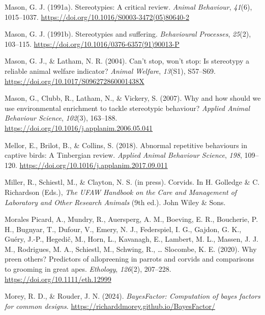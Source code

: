 \documentclass[
  pub]{apa6}
\newlength{\cslhangindent}
\newlength{\cslentryspacingunit} %
\newenvironment{CSLReferences}[2] %
 {%
  \setlength{\parindent}{0pt}
  \ifodd #1
  \let\oldpar\par
  \def\par{\hangindent=\cslhangindent\oldpar}
  \fi
  \setlength{\parskip}{#2\cslentryspacingunit}
 }%
 {}
\begin{document}
\begin{CSLReferences}{1}{0}
\leavevmode{}%
Mason, G. J. (1991a). Stereotypies: A critical review. \emph{Animal Behaviour}, \emph{41}(6), 1015--1037. \url{https://doi.org/10.1016/S0003-3472(05)80640-2}

\leavevmode{}%
Mason, G. J. (1991b). Stereotypies and suffering. \emph{Behavioural Processes}, \emph{25}(2), 103--115. \url{https://doi.org/10.1016/0376-6357(91)90013-P}

\leavevmode{}%
Mason, G. J., \& Latham, N. R. (2004). Can't stop, won't stop: Is stereotypy a reliable animal welfare indicator? \emph{Animal Welfare}, \emph{13}(S1), S57--S69. \url{https://doi.org/10.1017/S096272860001438X}

\leavevmode{}%
Mason, G., Clubb, R., Latham, N., \& Vickery, S. (2007). Why and how should we use environmental enrichment to tackle stereotypic behaviour? \emph{Applied Animal Behaviour Science}, \emph{102}(3), 163--188. \url{https://doi.org/10.1016/j.applanim.2006.05.041}

\leavevmode{}%
Mellor, E., Brilot, B., \& Collins, S. (2018). Abnormal repetitive behaviours in captive birds: A {Tinbergian} review. \emph{Applied Animal Behaviour Science}, \emph{198}, 109--120. \url{https://doi.org/10.1016/j.applanim.2017.09.011}

\leavevmode{}%
Miller, R., Schiestl, M., \& Clayton, N. S. (in press). Corvids. In H. Golledge \& C. Richardson (Eds.), \emph{The {UFAW Handbook} on the {Care} and {Management} of {Laboratory} and {Other Research Animals}} (9th ed.). {John Wiley \& Sons}.

\leavevmode{}%
Morales Picard, A., Mundry, R., Auersperg, A. M., Boeving, E. R., Boucherie, P. H., Bugnyar, T., Dufour, V., Emery, N. J., Federspiel, I. G., Gajdon, G. K., Guéry, J.-P., Hegedič, M., Horn, L., Kavanagh, E., Lambert, M. L., Massen, J. J. M., Rodrigues, M. A., Schiestl, M., Schwing, R., \ldots{} Slocombe, K. E. (2020). Why preen others? {Predictors} of allopreening in parrots and corvids and comparisons to grooming in great apes. \emph{Ethology}, \emph{126}(2), 207--228. \url{https://doi.org/10.1111/eth.12999}

\leavevmode{}%
Morey, R. D., \& Rouder, J. N. (2024). \emph{BayesFactor: Computation of bayes factors for common designs}. \url{https://richarddmorey.github.io/BayesFactor/}


\end{CSLReferences}
\end{document}
